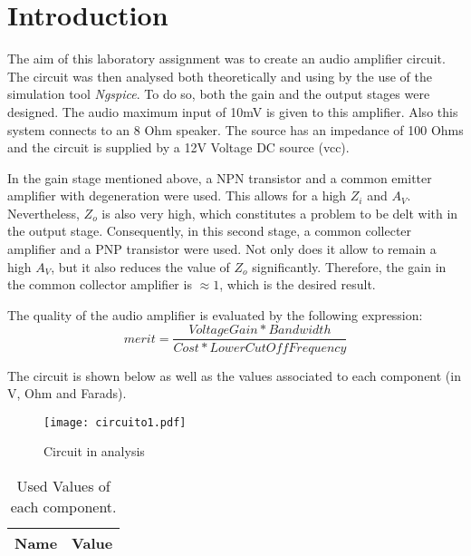 \section{Introduction}
\label{introduction}


\par The aim of this laboratory assignment was to create an audio amplifier circuit. The circuit was then analysed both theoretically and using by the use of the simulation tool \textit{Ngspice}. To do so, both the gain and the output stages were designed. The audio maximum input of 10mV is given to this amplifier. Also this system connects to an 8 Ohm speaker. The source has an impedance of 100 Ohms and the circuit is supplied by a 12V Voltage DC source (vcc).
\par In the gain stage mentioned above, a NPN transistor and a common emitter amplifier with degeneration were used. This allows for a high $Z_{i}$ and $A_{V}$. Nevertheless, $Z_{o}$ is also very high, which constitutes a problem to be delt with in the output stage. Consequently, in this second stage, a common collecter amplifier and a PNP transistor were used. Not only does it allow to remain a high $A_{V}$, but it also reduces the value of $Z_{o}$ significantly. Therefore, the gain in the common collector amplifier is $\approx 1$, which is the desired result.

\par The quality of the audio amplifier is evaluated by the following expression:
\begin {equation}
	 merit = \frac{Voltage Gain*Bandwidth}{Cost*Lower Cut Off Frequency}   	
	\label{merit}
\end{equation}

The circuit is shown below as well as the values associated to each component (in V, Ohm and Farads).

\begin{figure}[ht]
  \centering
  \texttt{[image: circuito1.pdf]}
  \caption{Circuit in analysis}
  \label{fig:sim4}
\end{figure}


\begin{table}[ht]
  \centering
  \begin{tabular}{|l|r|}
    \hline    
    {\bf Name} & {\bf Value} \\ \hline
     
  \end{tabular}
  \caption{Used Values of each component.}
  \label{tab:3}
\end{table}


\newpage

